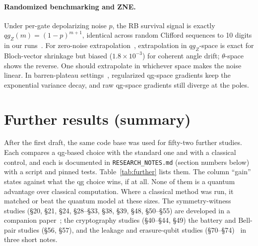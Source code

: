 \documentclass[11pt]{article}
\newcommand{\qgZ}{qg_Z}
\begin{document}
\paragraph{Randomized benchmarking and ZNE.} Under per-gate depolarizing noise $p$, the RB survival
signal is exactly $\qgZ(m)=(1-p)^{m+1}$, identical across random Clifford sequences to 10 digits
in our runs~\cite{magesan2011}. For zero-noise extrapolation~\cite{temme2017}, extrapolation in
$\qgZ$-space is exact for Bloch-vector shrinkage but biased ($1.8\times10^{-3}$) for coherent angle drift;
$\theta$-space shows the reverse. One should extrapolate in whichever space makes the noise linear.
In barren-plateau settings~\cite{mcclean2018,cerezo2021}, regularized qg-space gradients keep the
exponential variance decay, and raw qg-space gradients still diverge at the poles.

\section{Further results (summary)}\label{sec:further}

After the first draft, the same code base was used for fifty-two further studies. Each compares a
qg-based choice with the standard one and with a classical control, and each is documented in
\texttt{RESEARCH\_NOTES.md} (section numbers below) with a script and pinned tests.
Table~\ref{tab:further} lists them. The column ``gain'' states against what the qg choice wins,
if at all. None of them is a quantum advantage over classical computation. Where a classical
method was run, it matched or beat the quantum model at these sizes. The symmetry-witness studies
(\S20, \S21, \S24, \S28--\S33, \S38, \S39, \S48, \S50--\S55) are developed in a companion paper~\cite{monteverde2026witness}; the cryptography studies (\S40--\S44, \S49) the battery and Bell-pair studies (\S56, \S57), and the leakage and erasure-qubit studies (\S70--\S74)~\cite{monteverde2026leakage} in three short notes.
\end{document}
